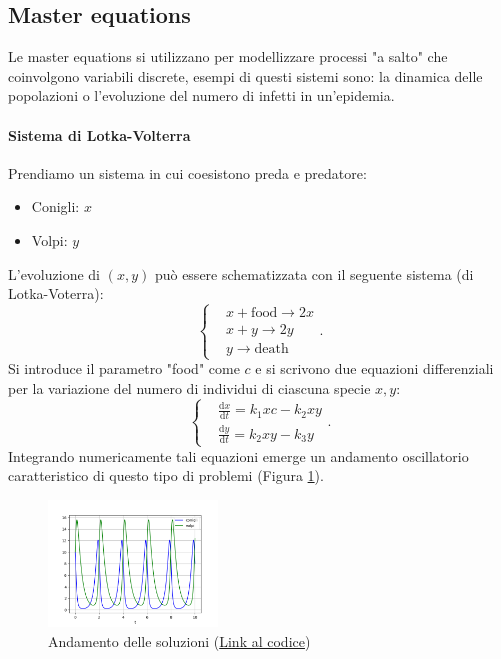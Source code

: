 \subsection{Master equations}%
Le master equations si utilizzano per modellizzare processi "a salto" che coinvolgono variabili discrete, esempi di questi sistemi sono: la dinamica delle popolazioni o l'evoluzione del numero di infetti in un'epidemia.
\paragraph{Sistema di Lotka-Volterra}
Prendiamo un sistema in cui coesistono preda e predatore:
\begin{itemize}
    \item Conigli: $x$ 
    \item Volpi: $y$ 
\end{itemize}
L'evoluzione di $(x, y)$ può essere schematizzata con il seguente sistema (di Lotka-Voterra):
 \[
    \begin{cases}
	& x+\text{food}\to 2x\\
	& x+y\to 2y\\
	& y\to \text{death}
    \end{cases}
.\] 
Si introduce il parametro "food" come $c$ e si scrivono due equazioni differenziali per la variazione del numero di individui di ciascuna specie $x, y$:
\[
    \begin{cases}
	&\frac{\text{d} x}{\text{d} t} =k_1xc-k_2xy\\
	&\frac{\text{d} y}{\text{d} t} = k_2xy-k_3y
    \end{cases}
.\] 
Integrando numericamente tali equazioni emerge un andamento oscillatorio caratteristico di questo tipo di problemi (Figura \ref{fig:conigli}).
\begin{figure}[H]
    \centering
    \includegraphics[width=0.4\textwidth]{figures/Volpi-Conigli.png}
\caption{\scriptsize Andamento delle soluzioni (\href{https://github.com/dodogabrie/Sistemi-Complessi/blob/master/python-project/lezione1/volpi_conigli.py}{Link al codice})}
    \label{fig:conigli}
\end{figure}
